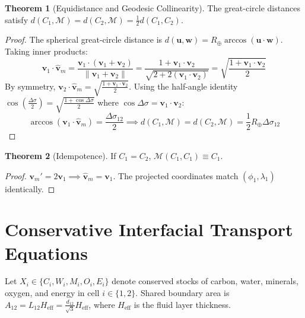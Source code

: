 \documentclass[11pt,a4paper]{article}
\theoremstyle{definition}
\newtheorem{theorem}{Theorem}
\begin{document}
\begin{theorem}[Equidistance and Geodesic Collinearity]
The great-circle distances satisfy $d(C_1, \mathcal{M}) = d(C_2, \mathcal{M}) = \frac{1}{2} d(C_1, C_2)$.
\end{theorem}
\begin{proof}
The spherical great-circle distance is $d(\mathbf{u}, \mathbf{w}) = R_\oplus \arccos(\mathbf{u} \cdot \mathbf{w})$. Taking inner products:
\begin{equation}
\mathbf{v}_1 \cdot \hat{\mathbf{v}}_m = \frac{\mathbf{v}_1 \cdot (\mathbf{v}_1 + \mathbf{v}_2)}{\|\mathbf{v}_1 + \mathbf{v}_2\|} = \frac{1 + \mathbf{v}_1 \cdot \mathbf{v}_2}{\sqrt{2 + 2(\mathbf{v}_1 \cdot \mathbf{v}_2)}} = \sqrt{\frac{1 + \mathbf{v}_1 \cdot \mathbf{v}_2}{2}}
\end{equation}
By symmetry, $\mathbf{v}_2 \cdot \hat{\mathbf{v}}_m = \sqrt{\frac{1 + \mathbf{v}_1 \cdot \mathbf{v}_2}{2}}$. Using the half-angle identity $\cos\left(\frac{\Delta\sigma}{2}\right) = \sqrt{\frac{1 + \cos\Delta\sigma}{2}}$ where $\cos\Delta\sigma = \mathbf{v}_1 \cdot \mathbf{v}_2$:
\begin{equation}
\arccos(\mathbf{v}_1 \cdot \hat{\mathbf{v}}_m) = \frac{\Delta\sigma_{12}}{2} \implies d(C_1, \mathcal{M}) = d(C_2, \mathcal{M}) = \frac{1}{2} R_\oplus \Delta\sigma_{12}
\end{equation}
\end{proof}

\begin{theorem}[Idempotence]
If $C_1 = C_2$, $\mathcal{M}(C_1, C_1) \equiv C_1$.
\end{theorem}
\begin{proof}
$\mathbf{v}_m' = 2\mathbf{v}_1 \implies \hat{\mathbf{v}}_m = \mathbf{v}_1$. The projected coordinates match $(\phi_1, \lambda_1)$ identically.
\end{proof}

\section{Conservative Interfacial Transport Equations}

Let $X_i \in \{C_i, W_i, M_i, O_i, E_i\}$ denote conserved stocks of carbon, water, minerals, oxygen, and energy in cell $i \in \{1, 2\}$. Shared boundary area is $A_{12} = L_{12} H_{\text{eff}} = \frac{d_{12}}{\sqrt{3}} H_{\text{eff}}$, where $H_{\text{eff}}$ is the fluid layer thickness.
\end{document}

